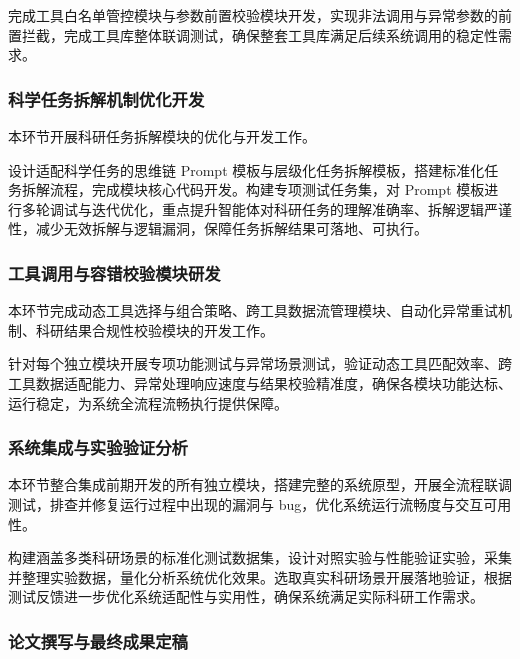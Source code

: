 完成工具白名单管控模块与参数前置校验模块开发，实现非法调用与异常参数的前置拦截\cite{qin2023toollearning}，完成工具库整体联调测试，确保整套工具库满足后续系统调用的稳定性需求。

\subsubsection{科学任务拆解机制优化开发}

本环节开展科研任务拆解模块的优化与开发工作。

设计适配科学任务的思维链 Prompt 模板与层级化任务拆解模板\cite{wang2023plansolve}，搭建标准化任务拆解流程，完成模块核心代码开发。构建专项测试任务集，对 Prompt 模板进行多轮调试与迭代优化，重点提升智能体对科研任务的理解准确率、拆解逻辑严谨性，减少无效拆解与逻辑漏洞，保障任务拆解结果可落地、可执行\cite{openai2023gpt4,yao2023react}。

\subsubsection{工具调用与容错校验模块研发}

本环节完成动态工具选择与组合策略、跨工具数据流管理模块、自动化异常重试机制、科研结果合规性校验模块的开发工作。

针对每个独立模块开展专项功能测试与异常场景测试，验证动态工具匹配效率、跨工具数据适配能力、异常处理响应速度与结果校验精准度\cite{schick2023toolformer,qin2023toollearning,shen2023hugginggpt}，确保各模块功能达标、运行稳定，为系统全流程流畅执行提供保障。

\subsubsection{系统集成与实验验证分析}

本环节整合集成前期开发的所有独立模块，搭建完整的系统原型，开展全流程联调测试，排查并修复运行过程中出现的漏洞与 bug，优化系统运行流畅度与交互可用性\cite{langchain2023,llamaindex2023}。

构建涵盖多类科研场景的标准化测试数据集，设计对照实验与性能验证实验，采集并整理实验数据，量化分析系统优化效果。选取真实科研场景开展落地验证\cite{jumper2021alphafold,butler2018ml4mat}，根据测试反馈进一步优化系统适配性与实用性，确保系统满足实际科研工作需求。

\subsubsection{论文撰写与最终成果定稿}

